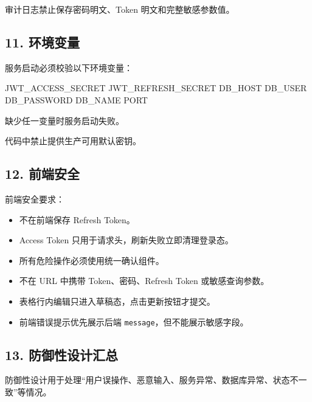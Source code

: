 \documentclass[
  a4paper,
  UTF8]{ctexart}
\newenvironment{Shaded}{}{}
\newcommand{\NormalTok}[1]{#1}
\providecommand{\tightlist}{%
  \setlength{\itemsep}{0pt}\setlength{\parskip}{0pt}}
\begin{document}
审计日志禁止保存密码明文、Token 明文和完整敏感参数值。

\hypertarget{ux73afux5883ux53d8ux91cf}{%
\subsection{11. 环境变量}\label{ux73afux5883ux53d8ux91cf}}

服务启动必须校验以下环境变量：

\begin{Shaded}
\begin{Highlighting}[]
\NormalTok{JWT\_ACCESS\_SECRET}
\NormalTok{JWT\_REFRESH\_SECRET}
\NormalTok{DB\_HOST}
\NormalTok{DB\_USER}
\NormalTok{DB\_PASSWORD}
\NormalTok{DB\_NAME}
\NormalTok{PORT}
\end{Highlighting}
\end{Shaded}

缺少任一变量时服务启动失败。

代码中禁止提供生产可用默认密钥。

\hypertarget{ux524dux7aefux5b89ux5168}{%
\subsection{12. 前端安全}\label{ux524dux7aefux5b89ux5168}}

前端安全要求：

\begin{itemize}
\tightlist
\item
  不在前端保存 Refresh Token。
\item
  Access Token 只用于请求头，刷新失败立即清理登录态。
\item
  所有危险操作必须使用统一确认组件。
\item
  不在 URL 中携带 Token、密码、Refresh Token 或敏感查询参数。
\item
  表格行内编辑只进入草稿态，点击更新按钮才提交。
\item
  前端错误提示优先展示后端 \texttt{message}，但不能展示敏感字段。
\end{itemize}

\hypertarget{ux9632ux5fa1ux6027ux8bbeux8ba1ux6c47ux603b}{%
\subsection{13.
防御性设计汇总}\label{ux9632ux5fa1ux6027ux8bbeux8ba1ux6c47ux603b}}

防御性设计用于处理``用户误操作、恶意输入、服务异常、数据库异常、状态不一致''等情况。
\end{document}
